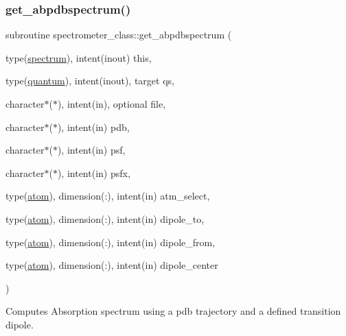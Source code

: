 \mbox{\label{namespacespectrometer__class_af1fc802879075c7e5e42ef4baac69445}} 
\subsubsection{\texorpdfstring{get\+\_\+abpdbspectrum()}{get\_abpdbspectrum()}}
{\footnotesize\ttfamily subroutine spectrometer\+\_\+class\+::get\+\_\+abpdbspectrum (\begin{DoxyParamCaption}\item[{type(\hyperlink{structspectrometer__class_1_1spectrum}{spectrum}), intent(inout)}]{this,  }\item[{type(\hyperlink{structquantum__class_1_1quantum}{quantum}), intent(inout), target}]{qs,  }\item[{character$\ast$($\ast$), intent(in), optional}]{file,  }\item[{character$\ast$($\ast$), intent(in)}]{pdb,  }\item[{character$\ast$($\ast$), intent(in)}]{psf,  }\item[{character$\ast$($\ast$), intent(in)}]{psfx,  }\item[{type(\hyperlink{structmolreader_1_1atom}{atom}), dimension(\+:), intent(in)}]{atm\+\_\+select,  }\item[{type(\hyperlink{structmolreader_1_1atom}{atom}), dimension(\+:), intent(in)}]{dipole\+\_\+to,  }\item[{type(\hyperlink{structmolreader_1_1atom}{atom}), dimension(\+:), intent(in)}]{dipole\+\_\+from,  }\item[{type(\hyperlink{structmolreader_1_1atom}{atom}), dimension(\+:), intent(in)}]{dipole\+\_\+center }\end{DoxyParamCaption})\hspace{0.3cm}{\ttfamily [private]}}



Computes Absorption spectrum using a pdb trajectory and a defined transition dipole. 


